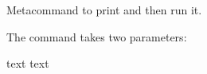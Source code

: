 \documentclass{article}
\begin{document}






%











\begin{docCommand}[
doc no index, %
doc name = cdr,
doc parameter = \marg{code},
doc description=meta,
] {}%
{}%
Metacommand to print  and then run it.
\begin{dispExample}
  The  command takes two parameters:\par
  text  text
\end{dispExample}
\end{docCommand}
\end{document}
